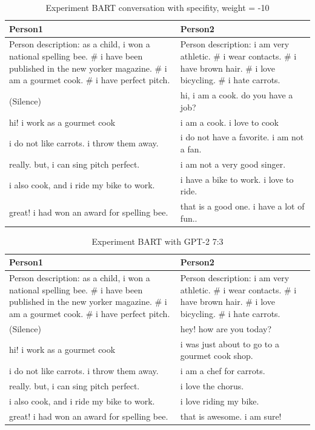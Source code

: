 \begin{table}[ht]
\centering
 \begin{tabular}{|p{7cm}|p{7cm}|} 
 \hline\hline
 \textbf{Person1} & \textbf{Person2} \\
 \hline\hline
 Person description: as a child, i won a national spelling bee. \# i have been published in the new yorker magazine. \# i am a gourmet cook. \# i have perfect pitch. & Person description: i am very athletic. \# i wear contacts. \# i have brown hair. \# i love bicycling. \# i hate carrots. \\
 \hline
 (Silence) & hi, i am a cook. do you have a job? \\ 
 \hline
 hi! i work as a gourmet cook & i am a cook. i love to cook \\
 \hline
 i do not like carrots. i throw them away. & i do not have a favorite. i am not a fan. \\
 \hline 
 really. but, i can sing pitch perfect. & i am not a very good singer. \\
 \hline
 i also cook, and i ride my bike to work. & i have a bike to work. i love to ride. \\
 \hline 
 great! i had won an award for spelling bee. & that is a good one. i have a lot of fun.. \\
 \hline\hline
 \end{tabular}
 \caption{Experiment BART conversation with specifity, weight = -10}
\label{tab:bart_conversation_idf5}
\end{table}

\begin{table}[ht]
\centering
 \begin{tabular}{|p{7cm}|p{7cm}|} 
 \hline\hline
 \textbf{Person1} & \textbf{Person2} \\
 \hline\hline
 Person description: as a child, i won a national spelling bee. \# i have been published in the new yorker magazine. \# i am a gourmet cook. \# i have perfect pitch. & Person description: i am very athletic. \# i wear contacts. \# i have brown hair. \# i love bicycling. \# i hate carrots. \\
 \hline
 (Silence) & hey! how are you today? \\ 
 \hline
 hi! i work as a gourmet cook & i was just about to go to a gourmet cook shop. \\
 \hline
 i do not like carrots. i throw them away. & i am a chef for carrots.\\
 \hline 
 really. but, i can sing pitch perfect. & i love the chorus. \\
 \hline
 i also cook, and i ride my bike to work. & i love riding my bike. \\
 \hline 
 great! i had won an award for spelling bee. & that is awesome. i am sure! \\
 \hline\hline
 \end{tabular}
 \caption{Experiment BART with GPT-2 7:3}
\label{tab:bart_conversation_gpt2}
\end{table}

